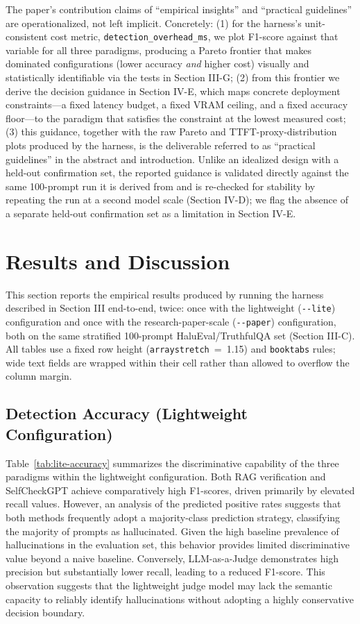 \documentclass[conference]{IEEEtran}
\begin{document}
The paper's contribution claims of ``empirical insights'' and ``practical guidelines'' are operationalized, not left implicit. Concretely: (1) for the harness's unit-consistent cost metric, \texttt{detection\_overhead\_ms}, we plot F1-score against that variable for all three paradigms, producing a Pareto frontier that makes dominated configurations (lower accuracy \emph{and} higher cost) visually and statistically identifiable via the tests in Section III-G; (2) from this frontier we derive the decision guidance in Section IV-E, which maps concrete deployment constraints---a fixed latency budget, a fixed VRAM ceiling, and a fixed accuracy floor---to the paradigm that satisfies the constraint at the lowest measured cost; (3) this guidance, together with the raw Pareto and TTFT-proxy-distribution plots produced by the harness, is the deliverable referred to as ``practical guidelines'' in the abstract and introduction. Unlike an idealized design with a held-out confirmation set, the reported guidance is validated directly against the same 100-prompt run it is derived from and is re-checked for stability by repeating the run at a second model scale (Section IV-D); we flag the absence of a separate held-out confirmation set as a limitation in Section IV-E.

\FloatBarrier
\section{Results and Discussion}

This section reports the empirical results produced by running the harness described in Section III end-to-end, twice: once with the lightweight (\texttt{-{}-lite}) configuration and once with the research-paper-scale (\texttt{-{}-paper}) configuration, both on the same stratified 100-prompt HaluEval/TruthfulQA set (Section III-C). All tables use a fixed row height (\texttt{arraystretch}~=~1.15) and \texttt{booktabs} rules; wide text fields are wrapped within their cell rather than allowed to overflow the column margin.

\subsection{Detection Accuracy (Lightweight Configuration)}

Table~\ref{tab:lite-accuracy} summarizes the discriminative capability of the three paradigms within the lightweight configuration. Both RAG verification and SelfCheckGPT achieve comparatively high F1-scores, driven primarily by elevated recall values. However, an analysis of the predicted positive rates suggests that both methods frequently adopt a majority-class prediction strategy, classifying the majority of prompts as hallucinated. Given the high baseline prevalence of hallucinations in the evaluation set, this behavior provides limited discriminative value beyond a naive baseline. Conversely, LLM-as-a-Judge demonstrates high precision but substantially lower recall, leading to a reduced F1-score. This observation suggests that the lightweight judge model may lack the semantic capacity to reliably identify hallucinations without adopting a highly conservative decision boundary.
\end{document}
